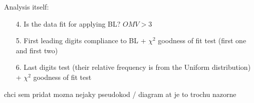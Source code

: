 Analysis itself: 

\begin{enumerate}
    \item[4.] Is the data fit for applying BL? $OMV > 3$
    \item[5.] First leading digits compliance to BL + $\chi^2$ goodness of fit test (first one and first two)
    \item[6.] Last digits test (their relative frequency is from the Uniform distribution) + $\chi^2$ goodness of fit test
\end{enumerate}

\begin{koment}
    chci sem pridat mozna nejaky pseudokod / diagram at je to trochu nazorne    
\end{koment}



